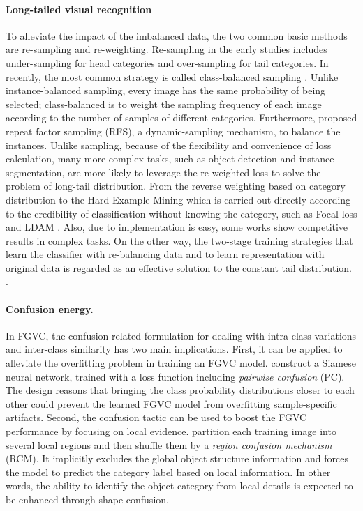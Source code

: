 \documentclass{article}
\begin{document}
\paragraph{Long-tailed visual recognition}
To alleviate the impact of the imbalanced data, the two common basic methods are re-sampling and re-weighting. Re-sampling in the early studies includes under-sampling \cite{drummond2003c4} for head categories and over-sampling \cite{ChawlaBHK02,HanWM05,mahajan2018exploring} for tail categories. In recently, the most common strategy is called class-balanced sampling \cite{ShenLH16}. Unlike instance-balanced sampling, every image has the same probability of being selected; class-balanced is to weight the sampling frequency of each image according to the number of samples of different categories. Furthermore, \cite{gupta2019lvis} proposed repeat
factor sampling (RFS), a dynamic-sampling mechanism, to balance the instances. Unlike sampling, because of the flexibility and convenience of loss calculation, many more complex tasks, such as object detection and instance segmentation, are more likely to leverage the re-weighted loss to solve the problem of long-tail distribution. From the reverse weighting based on category distribution to the Hard Example Mining \cite{ShrivastavaGG16} which is carried out directly according to the credibility of classification without knowing the category, such as Focal loss \cite{LinGGHD17} and LDAM \cite{cao2019learning}. Also, due to implementation is easy, some works \cite{CuiJLSB19,JamalB0WG20,TanWLLOYY20} show competitive results in complex tasks.  On the other way, the two-stage training strategies that learn the classifier with re-balancing data and to learn representation with original data is regarded as an effective solution to the constant tail distribution.
\cite{Kang2020Decoupling, zhou2020, LiWKTWLF20, HuJTCMZ20, abs-2007-11978, tang2020long, DBLP:conf/nips/YangX20}.
\vspace{-10pt}
\paragraph{Confusion energy.} 
In FGVC, the confusion-related formulation for dealing with intra-class variations and inter-class similarity has two main implications. First, it can be applied to alleviate the overfitting problem in training an FGVC model. \cite{dubey2018pairwise} construct a Siamese neural network, trained with a loss function including {\em pairwise confusion} (PC). The design reasons that bringing the class probability distributions closer to each other could prevent the learned FGVC model from overfitting sample-specific artifacts. Second, the confusion tactic can be used to boost the FGVC performance by focusing on local evidence. \cite{chen2019destruction} partition each training image into several local regions and then shuffle them by a {\em region confusion mechanism} (RCM). It implicitly excludes the global object structure information and forces the model to predict the category label based on local information. In other words, the ability to identify the object category from local details is expected to be enhanced through shape confusion.
\end{document}
